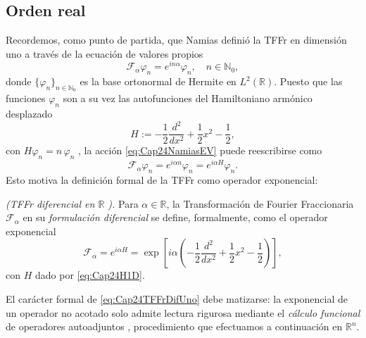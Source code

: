        \subsection{Orden real}


            Recordemos, como punto de partida, que Namias \citep{namias1980fractional} definió la TFFr en dimensión uno a través de la ecuación de valores propios
            \begin{equation}\label{eq:Cap24NamiasEV}
                \mathcal{F}_\alpha \varphi_n = e^{in\alpha}\varphi_n, \quad n\in \mathbb{N}_0,
            \end{equation}
            donde $\{\varphi_n\}_{n\in\mathbb{N}_0}$ es la base ortonormal de Hermite en $L^2(\mathbb{R})$. Puesto que las funciones $\varphi_n$ son a su vez las autofunciones del Hamiltoniano armónico desplazado
            \begin{equation}\label{eq:Cap24H1D}
                H := -\frac{1}{2}\frac{d^2}{dx^2} + \frac{1}{2}x^2 - \frac{1}{2},
            \end{equation}
            con $H\varphi_n = n\,\varphi_n$ \citep{szego1975orthogonal}, la acción \eqref{eq:Cap24NamiasEV} puede reescribirse como
            \begin{equation*}
                \mathcal{F}_\alpha \varphi_n = e^{i\alpha n}\varphi_n = e^{i\alpha H}\varphi_n.
            \end{equation*}
            Esto motiva la definición formal de la TFFr como operador exponencial:

            \begin{definition*}\textit{(TFFr diferencial en $\mathbb{R}$ \citep{namias1980fractional}).} Para $\alpha \in \mathbb{R}$, la Transformación de Fourier Fraccionaria $\mathcal{F}_\alpha$ en su \emph{formulación diferencial} se define, formalmente, como el operador exponencial
                \begin{equation}\label{eq:Cap24TFFrDifUno}
                    \mathcal{F}_\alpha = e^{i\alpha H} = \exp\left[i\alpha\left( -\frac{1}{2}\frac{d^2}{dx^2} + \frac{1}{2}x^2 - \frac{1}{2}\right)\right],
                \end{equation}
                con $H$ dado por \eqref{eq:Cap24H1D}.
            \end{definition*}

            El carácter formal de \eqref{eq:Cap24TFFrDifUno} debe matizarse: la exponencial de un operador no acotado solo admite lectura rigurosa mediante el \emph{cálculo funcional} de operadores autoadjuntos \citep[Ch. VIII]{reed1980methods}, procedimiento que efectuamos a continuación en $\mathbb{R}^n$.


